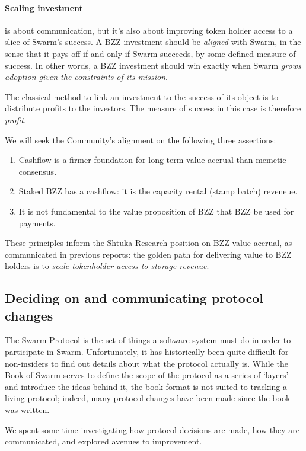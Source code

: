 \paragraph{Scaling investment} is about communication, but it's also about improving token holder access to a slice of Swarm's success.
%
A BZZ investment should be \emph{aligned} with Swarm, in the sense that it pays off if and only if Swarm succeeds, by some defined measure of success.
%
In other words, a BZZ investment should win exactly when Swarm \emph{grows adoption given the constraints of its mission}.

The classical method to link an investment to the success of its object is to distribute profits to the investors.
%
The measure of success in this case is therefore \emph{profit}.

We will seek the Community's alignment on the following three assertions:
%
\begin{enumerate}
\item Cashflow is a firmer foundation for long-term value accrual than memetic consensus.
\item Staked BZZ has a cashflow: it is the capacity rental (stamp batch) reveneue.
\item It is not fundamental to the value proposition of BZZ that BZZ be used for payments.
\end{enumerate}
%
These principles inform the Shtuka Research position on BZZ value accrual, as communicated in previous reports: the golden path for delivering value to BZZ holders is to \emph{scale tokenholder access to storage revenue}.



\subsection*{Deciding on and communicating protocol changes}

The Swarm Protocol is the set of things a software system must do in order to participate in Swarm.
%
Unfortunately, it has historically been quite difficult for non-insiders to find out details about what the protocol actually is.
%
While the \href{https://papers.ethswarm.org/p/book-of-swarm/}{Book of Swarm} serves to define the scope of the protocol as a series of `layers' and introduce the ideas behind it, the book format is not suited to tracking a living protocol; indeed, many protocol changes have been made since the book was written.

We spent some time investigating how protocol decisions are made, how they are communicated, and explored avenues to improvement.

